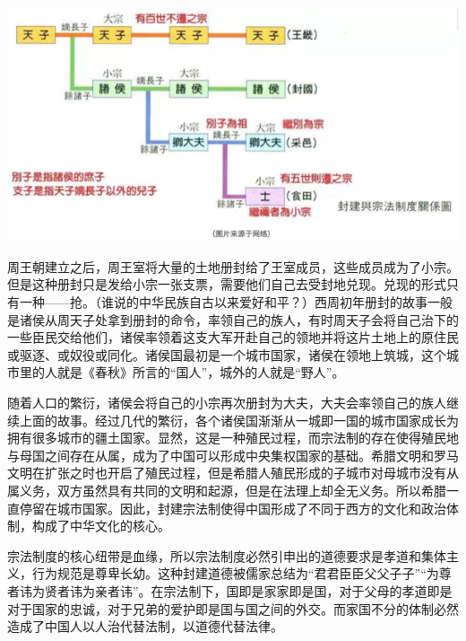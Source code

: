 \documentclass[]{book}
\begin{document}
\includegraphics[width=8.33in]{images/gx2}

周王朝建立之后，周王室将大量的土地册封给了王室成员，这些成员成为了小宗。但是这种册封只是发给小宗一张支票，需要他们自己去受封地兑现。兑现的形式只有一种------抢。（谁说的中华民族自古以来爱好和平？）西周初年册封的故事一般是诸侯从周天子处拿到册封的命令，率领自己的族人，有时周天子会将自己治下的一些臣民交给他们，诸侯率领着这支大军开赴自己的领地并将这片土地上的原住民或驱逐、或奴役或同化。诸侯国最初是一个城市国家，诸侯在领地上筑城，这个城市里的人就是《春秋》所言的``国人''，城外的人就是``野人''。

随着人口的繁衍，诸侯会将自己的小宗再次册封为大夫，大夫会率领自己的族人继续上面的故事。经过几代的繁衍，各个诸侯国渐渐从一城即一国的城市国家成长为拥有很多城市的疆土国家。显然，这是一种殖民过程，而宗法制的存在使得殖民地与母国之间存在从属，成为了中国可以形成中央集权国家的基础。希腊文明和罗马文明在扩张之时也开启了殖民过程，但是希腊人殖民形成的子城市对母城市没有从属义务，双方虽然具有共同的文明和起源，但是在法理上却全无义务。所以希腊一直停留在城市国家。因此，封建宗法制使得中国形成了不同于西方的文化和政治体制，构成了中华文化的核心。

宗法制度的核心纽带是血缘，所以宗法制度必然引申出的道德要求是孝道和集体主义，行为规范是尊卑长幼。这种封建道德被儒家总结为``君君臣臣父父子子''``为尊者讳为贤者讳为亲者讳''。在宗法制下，国即是家家即是国，对于父母的孝道即是对于国家的忠诚，对于兄弟的爱护即是国与国之间的外交。而家国不分的体制必然造成了中国人以人治代替法制，以道德代替法律。
\end{document}
